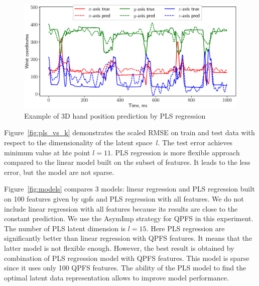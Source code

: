 \documentclass[12pt,twoside]{article}
\theoremstyle{definition}
\begin{document}
\begin{figure}
	\centering
	\includegraphics[width=\linewidth]{figs/ecog_prediction}
	\caption{Example of 3D hand position prediction by PLS regression}
	\label{fig:ecog_prediction}
\end{figure}

Figure~\ref{fig:pls_vs_k} demonstrates the scaled RMSE on train and test data with respect to the dimensionality of the latent space~$l$.
The test error achieves minimum value at hte point $l = 11$.
PLS regression is more flexible approach compared to the linear model built on the subset of features.
It leads to the less error, but the model are not sparse.

Figure~\ref{fig:models} compares 3 models: linear regression and PLS regression built on 100 features given by qpfs and PLS regression with all features.
We do not include linear regression with all features because its results are close to the constant prediction.
We use the AsymImp strategy for QPFS in this experiment.
The number of PLS latent dimension is $l = 15$.
Here PLS regression are significantly better than linear regression with QPFS features.
It means that the latter model is not flexible enough.
However, the best result is obtained by combination of PLS regression model with QPFS features. 
This model is sparse since it uses only 100 QPFS features.
The ability of the PLS model to find the optimal latent data representation allows to improve model performance. 
\end{document}
